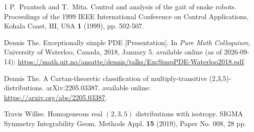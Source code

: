 \documentclass{amsart}
\theoremstyle{plain}
\theoremstyle{definition}
\theoremstyle{remark}
\begin{document}
\begin{thebibliography}{1}
P.~Prautsch and T.~Mita.
\newblock Control and analysis of the gait of snake robots.
\newblock Proceedings of the 1999 IEEE International Conference on Control Applications, Kohala Coast, HI, USA {\bf 1} (1999), pp. 502-507.

Dennis The.
\newblock Exceptionally simple {PDE} [{P}resentation].
\newblock In {\em Pure Math Colloquium}, University of Waterloo, Canada, 2018,
  January 5.
\newblock available online (as of 2026-09-14):
  \url{https://math.uit.no/ansatte/dennis/talks/ExcSimpPDE-Waterloo2018.pdf}.

Dennis The.
\newblock A Cartan-theoretic classification of multiply-transitive (2,3,5)-distributions.
\newblock arXiv:2205.03387. available online: \url{https://arxiv.org/abs/2205.03387}.

Travis Willse.
\newblock Homogeneous real $(2,3,5)$ distributions with isotropy.
\newblock SIGMA Symmetry Integrability Geom. Methods Appl. {\bf 15} (2019), Paper No. 008, 28 pp.

\end{thebibliography}
\end{document}
